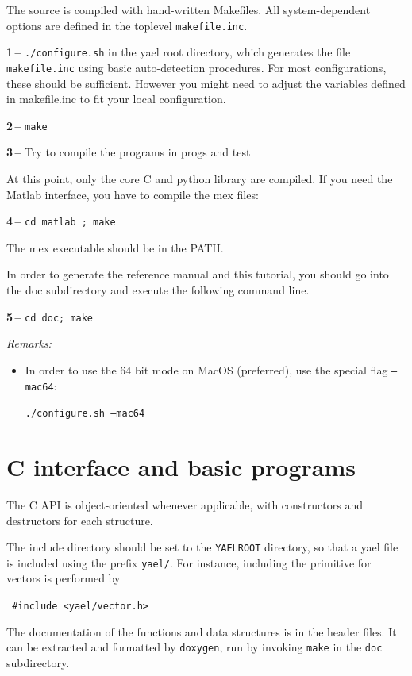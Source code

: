\documentclass[a4paper,11pt,notitlepage,final,twoside]{report}
\newcommand{\yroot}{\texttt{YAELROOT}\xspace}
\newcommand{\tc}[1]{\texttt{#1}}
\newcommand{\code}[1]{\smallskip 

\texttt{#1} 
 \medskip

}
\begin{document}
The source is compiled with hand-written Makefiles. 
All system-dependent options are defined in the toplevel \tc{makefile.inc}. 
\bigskip

{\bf 1\,--} \tc{./configure.sh} in the yael root directory, which generates 
the file \tc{makefile.inc} using basic auto-detection procedures. 
For most configurations, these should be sufficient. However you might need 
to adjust the variables defined in makefile.inc to fit your local configuration. 
\bigskip

{\bf 2\,--} \tc{make}
\bigskip

{\bf 3\,--} Try to compile the programs in progs and test
\medskip

At this point, only the core C and python library are compiled. 
If you need the Matlab interface, you have to compile the mex files:
\bigskip

{\bf 4\,--} \tc{cd matlab ; make}
\smallskip

The mex executable should be in the PATH. 
\bigskip

In order to generate the reference manual and this tutorial, you should go into the 
doc subdirectory and execute the following command line. 
\smallskip

{\bf 5\,--} \tc{cd doc; make}
\bigskip

{\it Remarks:}
\begin{itemize}
\item In order to use the 64 bit mode on MacOS (preferred), 
use the special flag \tc{--mac64}: 
\code{./configure.sh --mac64}
\end{itemize}


\chapter{C interface and basic programs}

The C API is object-oriented whenever applicable, with constructors and destructors for each structure. 
\medskip

The include directory should be set to the \yroot directory, so that a yael file is included using the prefix \texttt{yael/}. 
For instance, including the primitive for vectors is performed by
\code{
\#include <yael/vector.h>
}
\medskip

The documentation of the functions and data structures is in the header files. It can be extracted and formatted by \texttt{doxygen}, run by invoking \texttt{make} in the \texttt{doc} subdirectory. 
\medskip
\end{document}
